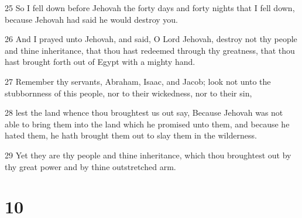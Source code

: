 \par 25 So I fell down before Jehovah the forty days and forty nights that I fell down, because Jehovah had said he would destroy you.
\par 26 And I prayed unto Jehovah, and said, O Lord Jehovah, destroy not thy people and thine inheritance, that thou hast redeemed through thy greatness, that thou hast brought forth out of Egypt with a mighty hand.
\par 27 Remember thy servants, Abraham, Isaac, and Jacob; look not unto the stubbornness of this people, nor to their wickedness, nor to their sin,
\par 28 lest the land whence thou broughtest us out say, Because Jehovah was not able to bring them into the land which he promised unto them, and because he hated them, he hath brought them out to slay them in the wilderness.
\par 29 Yet they are thy people and thine inheritance, which thou broughtest out by thy great power and by thine outstretched arm.

\chapter{10}

